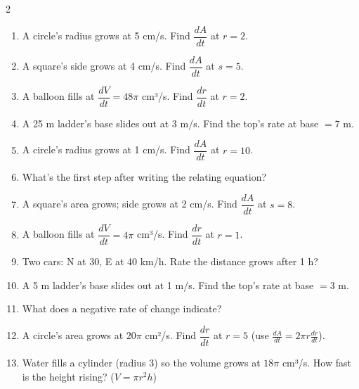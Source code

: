 \documentclass[11pt]{article}
\begin{document}
\begin{recapbox}
\begin{multicols}{2}
\small
\begin{enumerate}[leftmargin=*,itemsep=3pt]
  \item A circle's radius grows at 5 cm/s. Find $\dfrac{dA}{dt}$ at $r=2$.
  \item A square's side grows at 4 cm/s. Find $\dfrac{dA}{dt}$ at $s=5$.
  \item A balloon fills at $\dfrac{dV}{dt}=48\pi$ cm³/s. Find $\dfrac{dr}{dt}$ at $r=2$.
  \item A 25 m ladder's base slides out at 3 m/s. Find the top's rate at base $=7$ m.
  \item A circle's radius grows at 1 cm/s. Find $\dfrac{dA}{dt}$ at $r=10$.
  \item What's the first step after writing the relating equation?
  \item A square's area grows; side grows at 2 cm/s. Find $\dfrac{dA}{dt}$ at $s=8$.
  \item A balloon fills at $\dfrac{dV}{dt}=4\pi$ cm³/s. Find $\dfrac{dr}{dt}$ at $r=1$.
  \item Two cars: N at 30, E at 40 km/h. Rate the distance grows after 1 h?
  \item A 5 m ladder's base slides out at 1 m/s. Find the top's rate at base $=3$ m.
  \item What does a negative rate of change indicate?
  \item A circle's area grows at $20\pi$ cm²/s. Find $\dfrac{dr}{dt}$ at $r=5$ (use $\tfrac{dA}{dt}=2\pi r\tfrac{dr}{dt}$).
  \item Water fills a cylinder (radius 3) so the volume grows at $18\pi$ cm³/s. How fast is the height rising? ($V=\pi r^2 h$)
\end{enumerate}
\end{multicols}
\end{recapbox}
\end{document}

